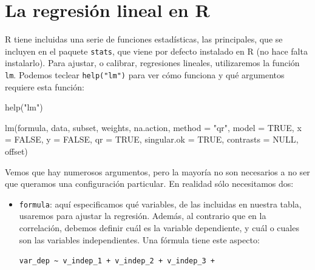 \documentclass[
  letterpaper,
  DIV=11,
  numbers=noendperiod]{scrreprt}
\newenvironment{Shaded}{\begin{snugshade}}{\end{snugshade}}
\newcommand{\AttributeTok}[1]{\textcolor[rgb]{0.40,0.45,0.13}{#1}}
\newcommand{\ConstantTok}[1]{\textcolor[rgb]{0.56,0.35,0.01}{#1}}
\newcommand{\FunctionTok}[1]{\textcolor[rgb]{0.28,0.35,0.67}{#1}}
\newcommand{\NormalTok}[1]{\textcolor[rgb]{0.00,0.23,0.31}{#1}}
\newcommand{\StringTok}[1]{\textcolor[rgb]{0.13,0.47,0.30}{#1}}
\begin{document}
\hypertarget{la-regresiuxf3n-lineal-en-r}{%
\section{La regresión lineal en R}\label{la-regresiuxf3n-lineal-en-r}}

R tiene incluidas una serie de funciones estadísticas, las principales,
que se incluyen en el paquete \texttt{stats}, que viene por defecto
instalado en R (no hace falta instalarlo). Para ajustar, o calibrar,
regresiones lineales, utilizaremos la función \texttt{lm}. Podemos
teclear \texttt{help("lm")} para ver cómo funciona y qué argumentos
requiere esta función:

\begin{Shaded}
\begin{Highlighting}[]
\FunctionTok{help}\NormalTok{(}\StringTok{"lm"}\NormalTok{)}
\end{Highlighting}
\end{Shaded}

\begin{Shaded}
\begin{Highlighting}[]
\FunctionTok{lm}\NormalTok{(formula, data, subset, weights, na.action, }\AttributeTok{method =} \StringTok{"qr"}\NormalTok{, }\AttributeTok{model =} \ConstantTok{TRUE}\NormalTok{, }\AttributeTok{x =} \ConstantTok{FALSE}\NormalTok{, }
   \AttributeTok{y =} \ConstantTok{FALSE}\NormalTok{, }\AttributeTok{qr =} \ConstantTok{TRUE}\NormalTok{, }\AttributeTok{singular.ok =} \ConstantTok{TRUE}\NormalTok{, }\AttributeTok{contrasts =} \ConstantTok{NULL}\NormalTok{, offset)}
\end{Highlighting}
\end{Shaded}

Vemos que hay numerosos argumentos, pero la mayoría no son necesarios a
no ser que queramos una configuración particular. En realidad sólo
necesitamos dos:

\begin{itemize}
\item
  \texttt{formula}: aquí especificamos qué variables, de las incluidas
  en nuestra tabla, usaremos para ajustar la regresión. Además, al
  contrario que en la correlación, debemos definir cuál es la variable
  dependiente, y cuál o cuales son las variables independientes. Una
  fórmula tiene este aspecto:

  \texttt{var\_dep\ \textasciitilde{}\ v\_indep\_1\ +\ v\_indep\_2\ +\ v\_indep\_3\ +}
\end{itemize}
\end{document}
